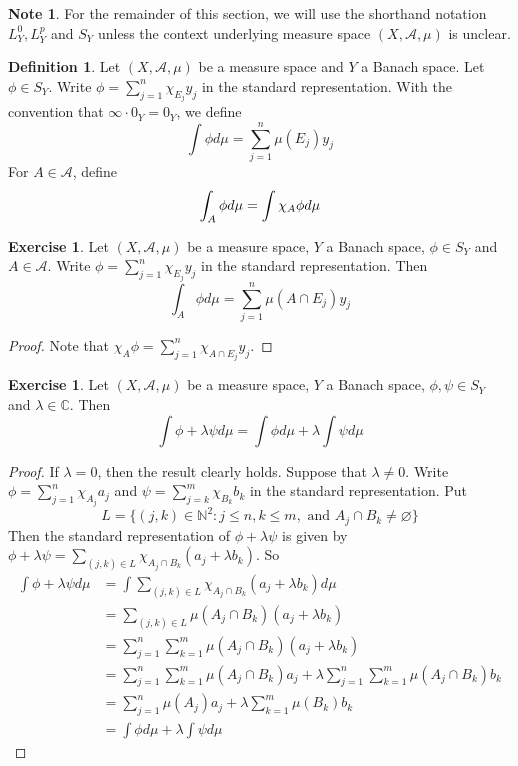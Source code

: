 \documentclass[12pt]{amsart}
\theoremstyle{definition}
\newtheorem{defn}[definition]{Definition}
\newtheorem{note}[definition]{Note}
\newtheorem{ex}[definition]{Exercise}
\newcommand{\lam}{\lambda}
\newcommand{\C}{\mathbb{C}}
\newcommand{\N}{\mathbb{N}}
\newcommand{\MA}{\mathcal{A}}
\newcommand{\lex}[1]{\label{ex:#1}}
\newcommand{\ld}[1]{\label{defn:#1}}
\begin{document}
	\begin{note}
	For the remainder of this section, we will use the shorthand notation $L^0_Y, L^p_Y$ and $S_Y$ unless the context underlying measure space $(X, \MA, \mu)$ is unclear.
	\end{note}
	
	\begin{defn} \ld{00000} 
	Let $(X, \MA, \mu)$ be a measure space and $Y$ a Banach space. Let $\phi \in S_Y$. Write $\phi = \sum\limits_{j=1}^n\chi_{E_j}y_j$ in the standard representation. With the convention that $\infty \cdot 0_Y = 0_Y$, we define $$\int \phi d\mu = \sum\limits_{j=1}^n \mu(E_j)y_j $$ For $A \in \MA$, define  $$\int_A \phi d \mu = \int \chi_A \phi d\mu \\$$
	\end{defn}
	
	\begin{ex} \lex{00000} 
	Let $(X, \MA, \mu)$ be a measure space, $Y$ a Banach space, $\phi \in S_Y$ and $A \in \MA$. Write $\phi = \sum\limits_{j=1}^n\chi_{E_j}y_j$ in the standard representation. Then $$\int_A \phi d\mu = \sum_{j=1}^n \mu(A \cap E_j)y_j$$
	\end{ex}
	
	\begin{proof}
	Note that $\chi_A \phi = \sum\limits_{j=1}^n\chi_{A \cap E_j}y_j$.
	\end{proof}		
	
	\begin{ex} \lex{00000} 
	Let $(X, \MA, \mu)$ be a measure space, $Y$ a Banach space, $\phi, \psi \in S_Y$ and $\lam \in \C$. Then $$\int \phi + \lam \psi d\mu = \int \phi d \mu + \lam \int \psi d\mu $$
	\end{ex}
	
	\begin{proof}
	If $\lam =0$, then the result clearly holds. Suppose that $\lam \neq 0$.	Write $\phi = \sum\limits_{j=1}^n\chi_{A_j}a_j$ and $\psi = \sum\limits_{j=k}^m\chi_{B_k}b_k$ in the standard representation. Put $$L = \{(j,k) \in \N^2: j \leq n, k \leq m, \text{ and } A_j \cap B_k \neq \varnothing\}$$ Then the standard representation of $\phi + \lam \psi$ is given by  $\phi + \lam \psi = \sum\limits_{(j,k) \in L} \chi_{A_j \cap B_k}(a_j + \lam b_k)$.
	So 
	\begin{align*}
	\int \phi + \lam \psi d \mu 
	&= \int \sum_{(j,k) \in L} \chi_{A_j \cap B_k}(a_j + \lam b_k) d \mu \\
	&= \sum_{(j,k) \in L} \mu(A_j \cap B_k)(a_j + \lam b_k) \\
	&= \sum_{j = 1}^n \sum_{k=1}^m \mu(A_j \cap B_k)(a_j + \lam b_k)  \\ 
	&= \sum_{j = 1}^n \sum_{k=1}^m \mu(A_j \cap B_k)a_j + \lam \sum_{j = 1}^n \sum_{k=1}^m \mu(A_j \cap B_k) b_k \\
	&= \sum_{j = 1}^n \mu(A_j)a_j +  \lam\sum_{k=1}^m \mu(B_k) b_k \\
	&= \int \phi d \mu + \lam \int \psi d\mu 
	\end{align*}
	\end{proof}
\end{document}
